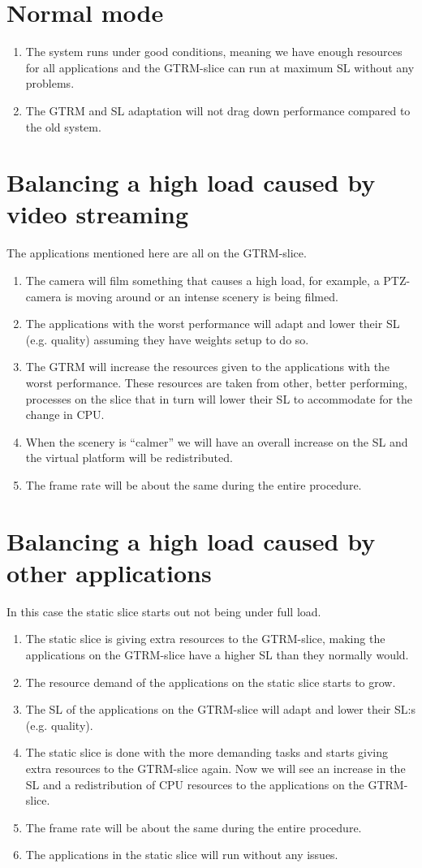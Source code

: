 \documentclass[nobiblatex]{LTHthesis}
\begin{document}
\section{Normal mode}
\begin{enumerate}
\item The system runs under good conditions, meaning we have enough resources for all applications and the GTRM-slice can run at maximum SL without any problems.
\item The GTRM and SL adaptation will not drag down performance compared to the old system.
\end{enumerate}
\section{Balancing a high load caused by video streaming}
The applications mentioned here are all on the GTRM-slice.

\begin{enumerate}
\item The camera will film something that causes a high load, for example, a PTZ-camera is moving around or an intense scenery is being filmed.
\item The applications with the worst performance  will adapt and lower their SL (e.g. quality) assuming they have weights setup to do so.
\item The GTRM will increase the resources given to the applications with the worst performance. These resources are taken from other, better performing,  processes on the slice that in turn will lower their SL to accommodate for the change in CPU.
\item When the scenery is “calmer” we will have an overall increase on the SL and the virtual platform will be redistributed.
\item The frame rate will be about the same during the entire procedure.
\end{enumerate}
\section{Balancing a high load caused by other applications}
In this case the static slice starts out not being under full load.
\begin{enumerate}
\item The static slice is giving extra resources to the GTRM-slice, making the applications on the GTRM-slice have a higher SL than they normally would.
\item The resource demand of the applications on the static slice starts to grow. 
\item The SL of the applications on the GTRM-slice will adapt and lower their SL:s (e.g. quality).
\item The static slice is done with the more demanding tasks and starts giving extra resources to the GTRM-slice again. Now we will see an increase in the SL and a redistribution of CPU resources to the applications on the GTRM-slice.
\item The frame rate will be about the same during the entire procedure.
\item The applications in the static slice will run without any issues.
\end{enumerate}
\end{document}
